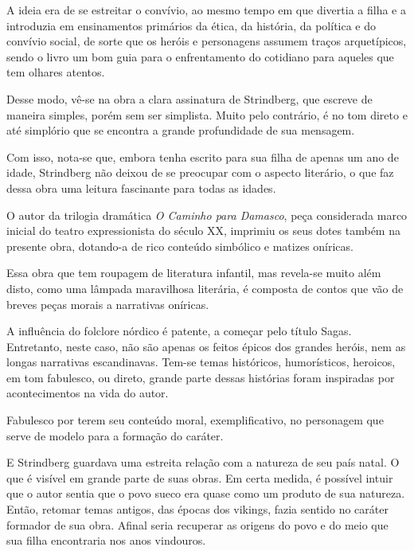\documentclass[12pt]{extarticle}
\begin{document}


A ideia era de se estreitar o convívio, ao mesmo tempo em que divertia a
filha e a introduzia em ensinamentos primários da ética, da história, da
política e do convívio social, de sorte que os heróis e personagens
assumem traços arquetípicos, sendo o livro um bom guia para o
enfrentamento do cotidiano para aqueles que tem olhares atentos.

Desse modo, vê-se na obra a clara assinatura de Strindberg, que escreve
de maneira simples, porém sem ser simplista. Muito pelo contrário, é no
tom direto e até simplório que se encontra a grande profundidade de sua
mensagem.

Com isso, nota-se que, embora tenha escrito para sua filha de apenas um
ano de idade, Strindberg não deixou de se preocupar com o aspecto
literário, o que faz dessa obra uma leitura fascinante para todas as
idades.




O autor da trilogia dramática \emph{O Caminho para Damasco}, peça
considerada marco inicial do teatro expressionista do século XX,
imprimiu os seus dotes também na presente obra, dotando-a de rico
conteúdo simbólico e matizes oníricas.

Essa obra que tem roupagem de literatura infantil, mas revela-se muito
além disto, como uma lâmpada maravilhosa literária, é composta de contos
que vão de breves peças morais a narrativas oníricas.

A influência do folclore nórdico é patente, a começar pelo título Sagas.
Entretanto, neste caso, não são apenas os feitos épicos dos grandes
heróis, nem as longas narrativas escandinavas. Tem-se temas históricos,
humorísticos, heroicos, em tom fabulesco, ou direto, grande parte dessas
histórias foram inspiradas por acontecimentos na vida do autor.

Fabulesco por terem seu conteúdo moral, exemplificativo, no personagem
que serve de modelo para a formação do caráter.

E Strindberg guardava uma estreita relação com a natureza de seu país
natal. O que é visível em grande parte de suas obras. Em certa medida, é
possível intuir que o autor sentia que o povo sueco era quase como um
produto de sua natureza. Então, retomar temas antigos, das épocas dos
vikings, fazia sentido no caráter formador de sua obra. Afinal seria
recuperar as origens do povo e do meio que sua filha encontraria nos
anos vindouros.
\end{document}
